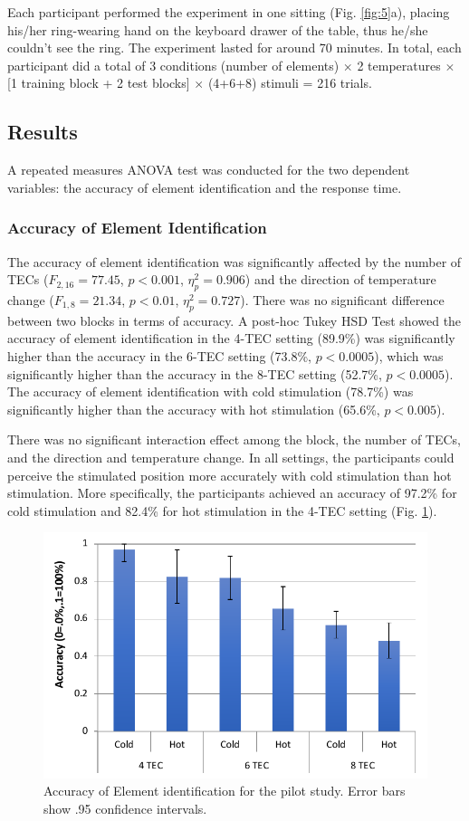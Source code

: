 \documentclass[preprint,12pt]{elsarticle}
\begin{document}
Each participant performed the experiment in one sitting (Fig. \ref{fig:5}a), placing his/her ring-wearing hand on the keyboard drawer of the table, thus he/she couldn't see the ring. The experiment lasted for around 70 minutes. In total, each participant did a total of 3 conditions (number of elements) $\times$ 2 temperatures $\times$ [1 training block + 2 test blocks] $\times$ (4+6+8) stimuli = 216 trials.


\subsection{Results}
A repeated measures ANOVA test was conducted for the two dependent variables: the accuracy of element identification and the response time.

\subsubsection{Accuracy of Element Identification}
The accuracy of element identification was significantly affected by the number of TECs ($F_{2,16} = 77.45$, $p < 0.001$, $\eta_p^2 = 0.906$) and the direction of temperature change ($F_{1,8} = 21.34$, $p < 0.01$, $\eta_p^2 = 0.727$).
There was no significant difference between two blocks in terms of accuracy.
A post-hoc Tukey HSD Test showed the accuracy of element identification in the 4-TEC setting (89.9\%) was significantly higher than the accuracy in the 6-TEC setting (73.8\%, $p < 0.0005$), which was significantly higher than the accuracy in the 8-TEC setting (52.7\%, $p < 0.0005$). The accuracy of element identification with cold stimulation (78.7\%) was significantly higher than the accuracy with hot stimulation (65.6\%, $p < 0.005$).

There was no significant interaction effect among the block, the number of TECs, and the direction and temperature change. In all settings, the participants could perceive the stimulated position more accurately with cold stimulation than hot stimulation. More specifically, the participants achieved an accuracy of 97.2\% for cold stimulation and 82.4\% for hot stimulation in the 4-TEC setting (Fig. \ref{fig:6}).

\begin{figure}[tp]
  \centering
  \includegraphics[width=0.7\columnwidth]{img/fig6.pdf}
  \caption{Accuracy of Element identification for the pilot study. Error bars show .95 confidence intervals.}
  \label{fig:6}
\end{figure}
\end{document}
